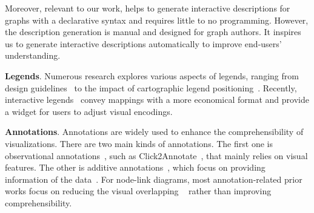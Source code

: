 Moreover, relevant to our work, \cite{DBLP:conf/vissym/LatifSB19} helps to generate interactive descriptions for graphs with a declarative syntax and requires little to no programming. However, the description generation is manual and designed for graph authors. It inspires us to generate interactive descriptions automatically to improve end-users' understanding.

\noindent \textbf{Legends}. Numerous research explores various aspects of legends, ranging from design guidelines~\cite{DBLP:journals/tvcg/DykesWS10} to the impact of cartographic legend positioning~\cite{doi:10.1080/00087041.2018.1533293}.
Recently, interactive legends~\cite{DBLP:conf/ACMse/TudoreanuH04} convey mappings with a more economical format and provide a widget for users to adjust visual encodings.

\noindent \textbf{Annotations}. Annotations are widely used to enhance the comprehensibility of visualizations. There are two main kinds of annotations. The first one is observational annotations~\cite{DBLP:conf/ieeevast/ChenBY10, DBLP:conf/ieeevast/Kandogan12, DBLP:journals/tvcg/BryanMW17}, such as Click2Annotate~\cite{DBLP:conf/ieeevast/ChenBY10}, that mainly relies on visual features. 
The other is additive annotations~\cite{DBLP:conf/chi/HullmanDA13, 10.1145/1622176.1622219, ren2017chartaccent, DBLP:conf/icip/ZhouT00}, which focus on providing information of the data~\cite{DBLP:conf/chi/LaiLJH0Y20}.
For node-link diagrams, most annotation-related prior works focus on reducing the visual overlapping ~\cite{DBLP:journals/isci/DogrusozKMT07, DBLP:conf/gd/HagenK08} rather than improving comprehensibility. 

